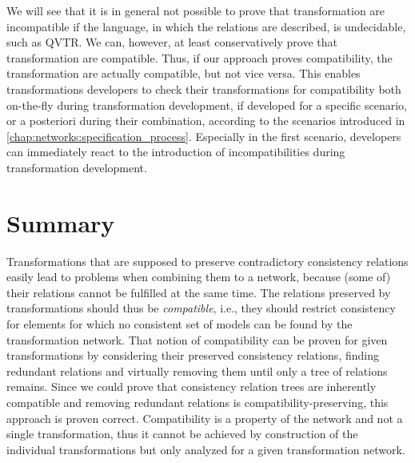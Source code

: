
We will see that it is in general not possible to prove that transformation are incompatible if the language, in which the relations are described, is undecidable, such as \gls{QVTR}.
We can, however, at least conservatively prove that transformation are compatible.
Thus, if our approach proves compatibility, the transformation are actually compatible, but not vice versa.
This enables transformations developers to check their transformations for compatibility both on-the-fly during transformation development, if developed for a specific scenario, or a posteriori during their combination, according to the scenarios introduced in \autoref{chap:networks:specification_process}.
Especially in the first scenario, developers can immediately react to the introduction of incompatibilities during transformation development.







\section{Summary}

\begin{insight}[Compatibility]
    Transformations that are supposed to preserve contradictory consistency relations easily lead to problems when combining them to a network, because (some of) their relations cannot be fulfilled at the same time.
    The relations preserved by transformations should thus be \emph{compatible}, i.e., they should restrict consistency for elements for which no consistent set of models can be found by the transformation network.
    That notion of compatibility can be proven for given transformations by considering their preserved consistency relations, finding redundant relations and virtually removing them until only a tree of relations remains. Since we could prove that consistency relation trees are inherently compatible and removing redundant relations is compatibility-preserving, this approach is proven correct.
    Compatibility is a property of the network and not a single transformation, thus it cannot be achieved by construction of the individual transformations but only analyzed for a given transformation network.
\end{insight}

